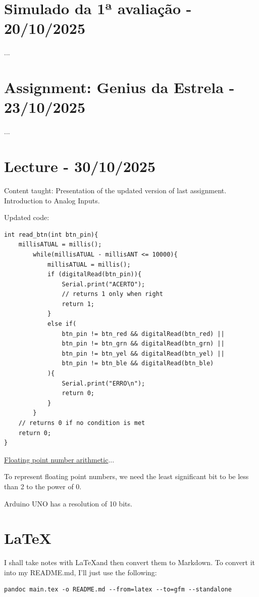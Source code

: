 \documentclass{article}
\begin{document}
\section{Simulado da 1ª avaliação - 20/10/2025}
...

\section{Assignment: Genius da Estrela - 23/10/2025}
...

\section{Lecture - 30/10/2025}
Content taught: Presentation of the updated version of last assignment. Introduction to Analog Inputs.

Updated code:
\begin{verbatim}
int read_btn(int btn_pin){
    millisATUAL = millis();
        while(millisATUAL - millisANT <= 10000){
            millisATUAL = millis();
            if (digitalRead(btn_pin)){
                Serial.print("ACERTO");
                // returns 1 only when right
                return 1;
            }
            else if(
                btn_pin != btn_red && digitalRead(btn_red) ||
                btn_pin != btn_grn && digitalRead(btn_grn) ||
                btn_pin != btn_yel && digitalRead(btn_yel) ||
                btn_pin != btn_ble && digitalRead(btn_ble)
            ){
                Serial.print("ERRO\n");
                return 0;
            }
        }
    // returns 0 if no condition is met    
    return 0;
}
\end{verbatim}

\href{https://en.wikipedia.org/wiki/IEEE_754}{Floating point number arithmetic}...

To represent floating point numbers, we need the least significant bit to be less than 2 to the power of 0.

Arduino UNO has a resolution of 10 bits. 

\section{\LaTeX}
I shall take notes with \LaTeX and then convert them to Markdown. To convert it into my README.md, I’ll just use the following:

\begin{verbatim}
pandoc main.tex -o README.md --from=latex --to=gfm --standalone
\end{verbatim}



\end{document}
